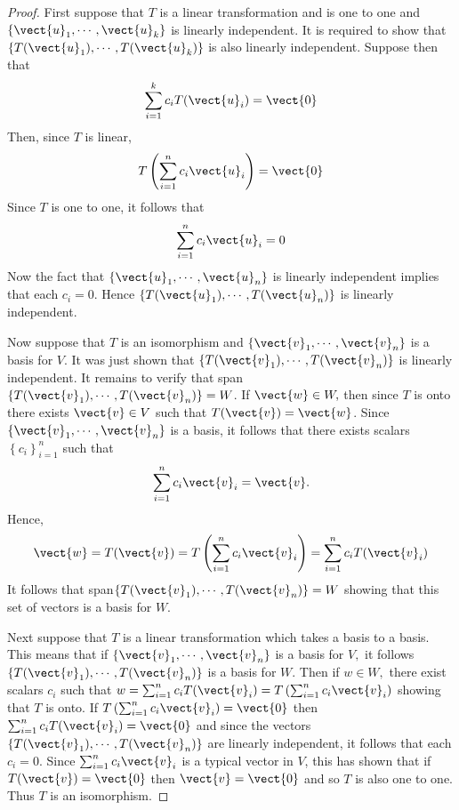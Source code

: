 \begin{proof}First suppose that $T$ is a linear transformation and is one to one
and $\left\{ \vect{u}_{1},\cdots ,\vect{u}_{k}\right\} $ is linearly
independent. It is required to show that $\left\{ T(\vect{u}_{1}),\cdots ,T(\vect{
u}_{k})\right\} $ is also linearly independent. Suppose then that 
\begin{equation*}
\sum_{i=1}^{k}c_{i}T(\vect{u}_{i})=\vect{0}
\end{equation*}
Then, since $T$ is linear, 
\begin{equation*}
T\left( \sum_{i=1}^{n}c_{i}\vect{u}_{i}\right) =\vect{0}
\end{equation*}
Since $T$ is one to one, it follows that 
\begin{equation*}
\sum_{i=1}^{n}c_{i}\vect{u}_{i}=0
\end{equation*}
Now the fact that $\left\{ \vect{u}_{1},\cdots ,\vect{u}_{n}\right\} $ is
linearly independent implies that each $c_{i}=0$. Hence $\left\{ T(\vect{u}
_{1}),\cdots ,T(\vect{u}_{n})\right\} $ is linearly independent.

Now suppose that $T$ is an isomorphism and $\left\{ \vect{v}_{1},\cdots ,\vect{
v}_{n}\right\} $ is a basis for $V$. It was just shown that $\left\{ T(\vect{v}
_{1}),\cdots ,T(\vect{v}_{n})\right\} $ is linearly independent. It remains to
verify that span$\left\{ T(\vect{v}_{1}),\cdots ,T(\vect{v}_{n})\right\}=W$. If $\vect{w}\in W,$ then since $T$ is onto there
exists $\vect{v}\in V$ such that $T(\vect{v})=\vect{w}$. Since $\left\{ \vect{v}
_{1},\cdots ,\vect{v}_{n}\right\} $ is a basis, it follows that there exists
scalars $\left\{ c_{i}\right\} _{i=1}^{n}$ such that 
\begin{equation*}
\sum_{i=1}^{n}c_{i}\vect{v}_{i}=\vect{v}.
\end{equation*}
Hence, 
\begin{equation*}
\vect{w}=T(\vect{v})=T\left( \sum_{i=1}^{n}c_{i}\vect{v}_{i}\right)
=\sum_{i=1}^{n}c_{i}T(\vect{v}_{i})
\end{equation*}
It follows that span$\left\{ T(\vect{v}_{1}),\cdots , T(\vect{v}_{n})\right\} =W$ showing that this set of vectors is a
basis for $W$.

Next suppose that $T$ is a linear transformation which takes a basis to a basis. This means that if $\left\{ \vect{v}_{1},\cdots ,\vect{v}_{n}\right\} $ is a basis for $V,$ it
follows $\left\{ T(\vect{v}_{1}),\cdots ,T(\vect{v}_{n})\right\} $ is a basis for $
W.$ Then if $w\in W,$ there exist scalars $c_{i}$ such that $
w=\sum_{i=1}^{n}c_{i}T(\vect{v}_{i})=T\left( \sum_{i=1}^{n}c_{i}\vect{v}_{i}\right) $
showing that $T$ is onto. If $T\left( \sum_{i=1}^{n}c_{i}\vect{v}_{i}\right) =\vect{0}$
then $\sum_{i=1}^{n}c_{i}T(\vect{v}_{i})=\vect{0}$ and since the vectors $\left\{ T(\vect{v}
_{1}),\cdots ,T(\vect{v}_{n})\right\} $ are linearly independent, it follows
that each $c_{i}=0.$ Since $\sum_{i=1}^{n}c_{i}\vect{v}_{i}$ is a typical vector in 
$V$, this has shown that if $T(\vect{v})=\vect{0}$ then $\vect{v}=\vect{0}$ and so $T$ is also one to one.
Thus $T$ is an isomorphism. 
\end{proof}

